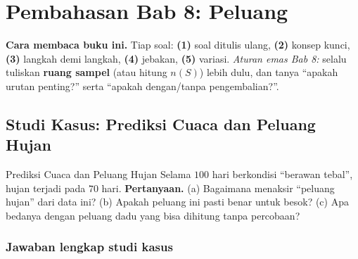 
\renewcommand{\babjudul}{Pembahasan Latihan — Bab 8}


\setcounter{chapter}{8}

\chapter*{Pembahasan Bab 8: Peluang}

\begin{tips}
\textbf{Cara membaca buku ini.} Tiap soal: \textbf{(1)} soal ditulis ulang,
\textbf{(2)} konsep kunci, \textbf{(3)} langkah demi langkah, \textbf{(4)}
jebakan, \textbf{(5)} variasi. \emph{Aturan emas Bab 8:} selalu tuliskan
\textbf{ruang sampel} (atau hitung $n(S)$) lebih dulu, dan tanya ``apakah urutan
penting?'' serta ``apakah dengan/tanpa pengembalian?''.
\end{tips}

\section*{Studi Kasus: Prediksi Cuaca dan Peluang Hujan}

\begin{studikasus}{Prediksi Cuaca dan Peluang Hujan}
Selama $100$ hari berkondisi ``berawan tebal'', hujan terjadi pada $70$ hari.
\textbf{Pertanyaan.} (a) Bagaimana menaksir ``peluang hujan'' dari data ini?
(b) Apakah peluang ini pasti benar untuk besok? (c) Apa bedanya dengan peluang
dadu yang bisa dihitung tanpa percobaan?
\end{studikasus}

\subsection*{Jawaban lengkap studi kasus}

